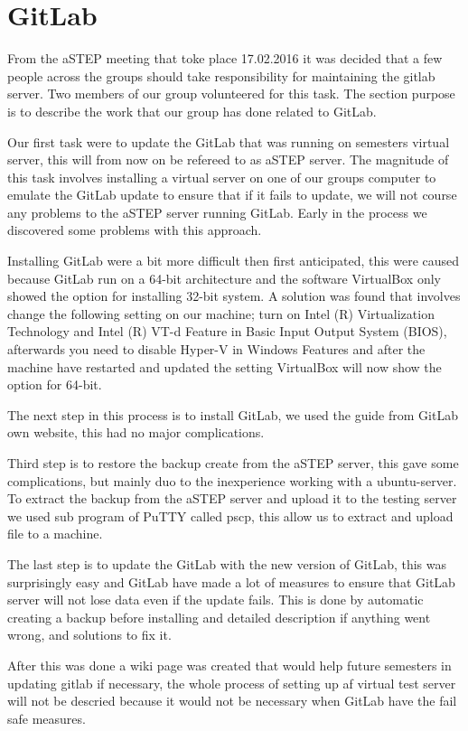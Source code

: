 \section{GitLab}
From the aSTEP meeting that toke place 17.02.2016 it was decided that a few people across the groups should take responsibility for maintaining the gitlab server. Two members of our group volunteered for this task. The section purpose is to describe the work that our group has done related to GitLab.

Our first task were to update the GitLab that was running on semesters virtual server, this will from now on be refereed to as aSTEP server. The magnitude of this task involves installing a virtual server on one of our groups computer to emulate the GitLab update to ensure that if it fails to update, we will not course any problems to the aSTEP server running GitLab. Early in the process we discovered some problems with this approach.

Installing GitLab were a bit more difficult then first anticipated, this were caused because GitLab run on a 64-bit architecture and the software VirtualBox only showed the option for installing 32-bit system. A solution was found that involves change the following setting on our machine; turn on Intel (R) Virtualization Technology and Intel (R) VT-d Feature in Basic Input Output System (BIOS), afterwards you need to disable Hyper-V in Windows Features and after the machine have restarted and updated the setting VirtualBox will now show the option for 64-bit.

The next step in this process is to install GitLab, we used the guide from GitLab own website\cite{gitlab_guide}, this had no major complications.

Third step is to restore the backup create from the aSTEP server, this gave some complications, but mainly duo to the inexperience working with a ubuntu-server. To extract the backup from the aSTEP server and upload it to the testing server we used sub program of PuTTY called pscp, this allow us to extract and upload file to a machine.

The last step is to update the GitLab with the new version of GitLab, this was surprisingly easy and GitLab have made a lot of measures to ensure that GitLab server will not lose data even if the update fails. This is done by automatic creating a backup before installing and detailed description if anything went wrong, and solutions to fix it.

After this was done a wiki page was created that would help future semesters in updating gitlab if necessary, the whole process of setting up af virtual test server will not be descried because it would not be necessary when GitLab have the fail safe measures.


